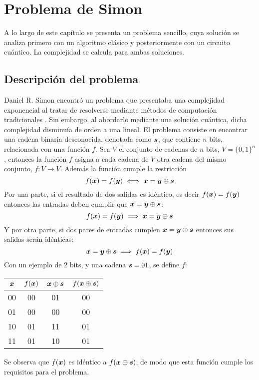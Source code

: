 \chapter{Problema de Simon}

A lo largo de este capítulo se presenta un problema sencillo, cuya solución se 
analiza primero con un algoritmo clásico y posteriormente con un circuito 
cuántico. La complejidad se calcula para ambas soluciones.

\section{Descripción del problema}

Daniel R. Simon encontró un problema que presentaba una complejidad exponencial 
al tratar de resolverse mediante métodos de computación tradicionales 
\cite{simon94}. Sin embargo, al abordarlo mediante una solución cuántica, dicha 
complejidad disminuía de orden a una lineal.
%
El problema consiste en encontrar una cadena binaria desconocida, denotada como 
$\boldsymbol{s}$, que contiene $n$ bits, relacionada con una función $f$. Sea $V$ el 
conjunto de cadenas de $n$ bits, $V = \{0,1\}^n$, entonces la función $f$ asigna 
a cada cadena de $V$ otra cadena del mismo conjunto, $f:V \rightarrow V$.
%
Además la función cumple la restricción
%
\begin{equation}
	\label{eq:simon_f}
	f(\boldsymbol{x}) = f(\boldsymbol{y}) \iff \boldsymbol{x} = \boldsymbol{y} \oplus \boldsymbol{s}
\end{equation}
%
Por una parte, si el resultado de dos salidas es idéntico, es decir $f(\boldsymbol{x}) = 
f(\boldsymbol{y})$ entonces las entradas deben cumplir que $\boldsymbol{x} = \boldsymbol{y} \oplus \boldsymbol{s}$:
%
$$ f(\boldsymbol{x}) = f(\boldsymbol{y}) \implies \boldsymbol{x} = \boldsymbol{y} \oplus \boldsymbol{s} $$
%
Y por otra parte, si dos pares de entradas cumplen $\boldsymbol{x} = \boldsymbol{y} \oplus \boldsymbol{s}$ 
entonces sus salidas serán idénticas:
%
$$ \boldsymbol{x} = \boldsymbol{y} \oplus \boldsymbol{s} \implies f(\boldsymbol{x}) = f(\boldsymbol{y}) $$
%
Con un ejemplo de 2 bits, y una cadena $\boldsymbol{s} = 01$, se define $f$:
%
\begin{center}
\begin{tabular}{|c|c||c|c|}
	\hline
	$\boldsymbol{x}$ & $f(\boldsymbol{x})$ & $\boldsymbol{x} \oplus \boldsymbol{s}$ & $f(\boldsymbol{x} \oplus \boldsymbol{s})$\\
	\hline
	00 & 00 & 01 & 00\\
	01 & 00 & 00 & 00\\
	10 & 01 & 11 & 01\\
	11 & 01 & 10 & 01\\
	\hline
\end{tabular}
\end{center}
%
Se observa que $f(\boldsymbol{x})$ es idéntico a $f(\boldsymbol{x} \oplus \boldsymbol{s})$, de modo que esta 
función cumple los requisitos para el problema.

